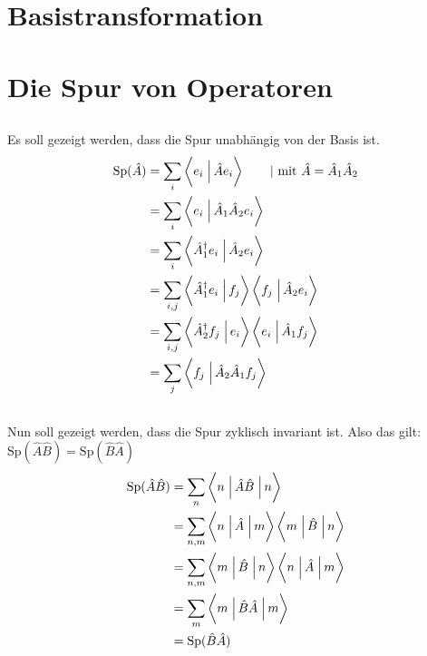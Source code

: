 \section{Basistransformation}
\section{Die Spur von Operatoren}
\subsection{}
Es soll gezeigt werden, dass die Spur unabhängig von der Basis ist.
\begin{align*}
    \text{Sp}(\hat A) &= \sum_i \braket{e_i}{\hat Ae_i} \qquad|\text{ mit } \hat A=\hat A_1\hat A_2 \\
                      &= \sum_i \braket{e_i}{\hat A_1\hat A_2e_i} \\
                      &= \sum_i \braket{\hat A_1^\dagger e_i}{\hat A_2e_i} \\
                      &= \sum_{i,j} \braket{\hat A_1^\dagger e_i}{ f_j } \braket{f_j}{\hat A_2e_i} \\
                      &= \sum_{i,j}\braket{\hat A_2^\dagger f_j}{e_i} \braket{e_i}{\hat A_1f_j} \\
                      &= \sum_j \braket{f_j}{\hat A_2\hat A_1f_j} \\
\end{align*}

\subsection{}
Nun soll gezeigt werden, dass die Spur zyklisch invariant ist.
Also das gilt: $\text{Sp}(\hat A\hat B) = \text{Sp}(\hat B\hat A)$
\begin{align*}
    \text{Sp}(\hat A\hat B) &= \sum_n \braopket{n}{\hat A\hat B}{n} \\
                           &= \sum_{n,m} \braopket{n}{\hat A}{m} \braopket{m}{\hat B}{n} \\
                           &= \sum_{n,m} \braopket{m}{\hat B}{n}\braopket{n}{\hat A}{m} \\
                           &= \sum_m \braopket{m}{\hat B\hat A}{m} \\
                           &=\text{Sp}(\hat B\hat A)
\end{align*}


